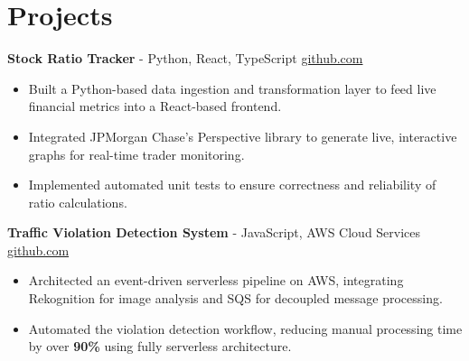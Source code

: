 \documentclass[11pt]{article}
\begin{document}
\vspace{-18.5pt}

\section*{Projects}

\textbf{Stock Ratio Tracker}{ - Python, React, TypeScript} \hfill \href{https://github.com/Monica20030707/Trading-Dashboard_UI}{github.com}
\vspace{-9pt}
\begin{itemize}
  \item Built a Python-based data ingestion and transformation layer to feed live financial metrics into a React-based frontend.
  \item Integrated JPMorgan Chase's Perspective library to generate live, interactive graphs for real-time trader monitoring.
  \item Implemented automated unit tests to ensure correctness and reliability of ratio calculations.
\end{itemize}

\textbf{Traffic Violation Detection System}{ - JavaScript, AWS Cloud Services} \hfill \href{https://github.com/Monica20030707/AWS_rekonigition-N-read-database}{github.com}
\vspace{-9pt}
\begin{itemize}
  \item Architected an event-driven serverless pipeline on AWS, integrating Rekognition for image analysis and SQS for decoupled message processing.
  \item Automated the violation detection workflow, reducing manual processing time by over \textbf{90\%} using fully serverless architecture.
\end{itemize}

\end{document}
